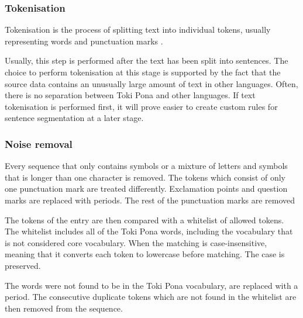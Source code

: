\documentclass[14pt, a4paper]{extreport}
\begin{document}
      \subsubsection{Tokenisation}
Tokenisation is the process of splitting text into individual tokens, usually representing words and punctuation marks \parencite[49]{vajjala}.

Usually, this step is performed after the text has been split into sentences. The choice to perform tokenisation at this stage is supported by the fact that the source data contains an unusually large amount of text in other languages. Often, there is no separation between Toki Pona and other languages. If text tokenisation is performed first, it will prove easier to create custom rules for sentence segmentation at a later stage.

%
      \subsubsection{Noise removal}
Every sequence that only contains symbols or a mixture of letters and symbols that is longer than one character is removed. The tokens which consist of only one punctuation mark are treated differently. Exclamation points and question marks are replaced with periods. The rest of the punctuation marks are removed

The tokens of the entry are then compared with a whitelist of allowed tokens. The whitelist includes all of the Toki Pona words, including the vocabulary that is not considered core vocabulary. When the matching is case-insensitive, meaning that it converts each token to lowercase before matching. The case is preserved.

The words were not found to be in the Toki Pona vocabulary, are replaced with a period. The consecutive duplicate tokens which are not found in the whitelist are then removed from the sequence.
\end{document}

